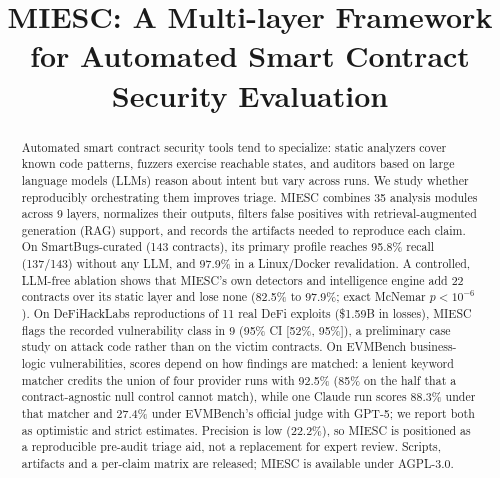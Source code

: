 \documentclass[conference]{IEEEtran}
\begin{document}
\title{MIESC: A Multi-layer Framework for Automated Smart Contract Security Evaluation}

\author{
}

\maketitle

\begin{abstract}
Automated smart contract security tools tend to specialize: static analyzers cover known code patterns, fuzzers exercise reachable states, and auditors based on large language models (LLMs) reason about intent but vary across runs. We study whether reproducibly orchestrating them improves triage. MIESC combines 35 analysis modules across 9 layers, normalizes their outputs, filters false positives with retrieval-augmented generation (RAG) support, and records the artifacts needed to reproduce each claim. On SmartBugs-curated (143 contracts), its primary profile reaches 95.8\% recall (137/143) without any LLM, and 97.9\% in a Linux/Docker revalidation. A controlled, LLM-free ablation shows that MIESC's own detectors and intelligence engine add 22 contracts over its static layer and lose none (82.5\% to 97.9\%; exact McNemar $p<10^{-6}$). On DeFiHackLabs reproductions of 11 real DeFi exploits (\$1.59B in losses), MIESC flags the recorded vulnerability class in 9 (95\% CI [52\%, 95\%]), a preliminary case study on attack code rather than on the victim contracts. On EVMBench business-logic vulnerabilities, scores depend on how findings are matched: a lenient keyword matcher credits the union of four provider runs with 92.5\% (85\% on the half that a contract-agnostic null control cannot match), while one Claude run scores 88.3\% under that matcher and 27.4\% under EVMBench's official judge with GPT-5; we report both as optimistic and strict estimates. Precision is low (22.2\%), so MIESC is positioned as a reproducible pre-audit triage aid, not a replacement for expert review. Scripts, artifacts and a per-claim matrix are released; MIESC is available under AGPL-3.0.
\end{abstract}
\end{document}
